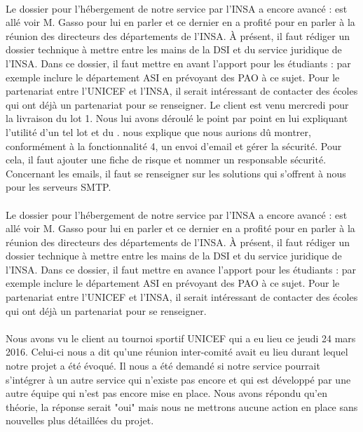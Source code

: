 \documentclass [a4paper] {article}
\begin{document}
\paragraph*{}
Le dossier pour l’hébergement de notre service par l'INSA a encore avancé : \Sergi{} est allé voir M. Gasso pour lui en parler et ce dernier en a profité pour en parler à la réunion des directeurs des départements de l'INSA. À présent, il faut rédiger un dossier technique à mettre entre les mains de la DSI et du service juridique de l'INSA. Dans ce dossier, il faut mettre en avant l'apport pour les étudiants : par exemple inclure le département ASI en prévoyant des PAO à ce sujet. Pour le partenariat entre l'UNICEF et l'INSA, il serait intéressant de contacter des écoles qui ont déjà un partenariat pour se renseigner.
Le client est venu mercredi pour la livraison du lot 1. Nous lui avons déroulé le \CDR{} point par point en lui expliquant l'utilité d'un tel lot et du \CDR{}. \nomTuteurPedago{} nous explique que nous aurions dû montrer, conformément à la fonctionnalité 4, un envoi d'email et gérer la sécurité. Pour cela, il faut ajouter une fiche de risque et nommer un responsable sécurité. Concernant les emails, il faut se renseigner sur les solutions qui s'offrent à nous pour les serveurs SMTP.

\paragraph*{}
Le dossier pour l’hébergement de notre service par l'INSA a encore avancé : \Sergi est allé voir M. Gasso pour lui en parler et ce dernier en a profité pour en parler à la réunion des directeurs des départements de l'INSA. À présent, il faut rédiger un dossier technique à mettre entre les mains de la DSI et du service juridique de l'INSA. Dans ce dossier, il faut mettre en avance l'apport pour les étudiants : par exemple inclure le département ASI en prévoyant des PAO à ce sujet. Pour le partenariat entre l'UNICEF et l'INSA, il serait intéressant de contacter des écoles qui ont déjà un partenariat pour se renseigner.

\paragraph*{}
Nous avons vu le client au tournoi sportif UNICEF qui a eu lieu ce jeudi 24 mars 2016. Celui-ci nous a dit qu'une réunion inter-comité avait eu lieu durant lequel notre projet a été évoqué. Il nous a été demandé si notre service pourrait s'intégrer à un autre service qui n'existe pas encore et qui est développé par une autre équipe qui n'est pas encore mise en place. Nous avons répondu qu'en théorie, la réponse serait "oui" mais nous ne mettrons aucune action en place sans nouvelles plus détaillées du projet.

\newpage
\end{document}
